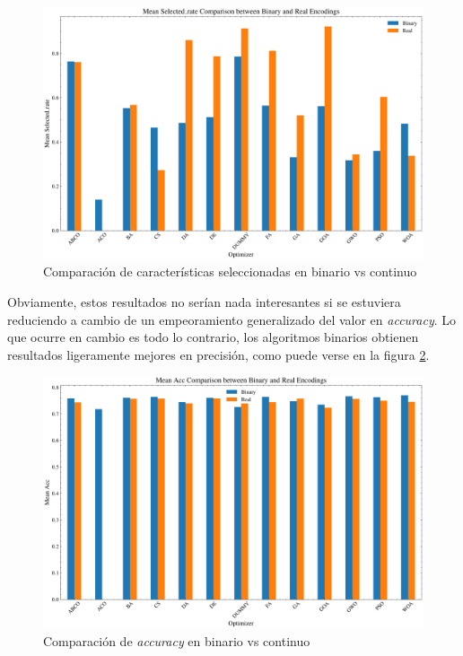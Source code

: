 \begin{figure}[htp]
    \includegraphics[width=1\textwidth]{imagenes/selected_rate_comparison.png}
    \caption{Comparación de características seleccionadas en binario vs continuo}
    \label{fig:bin_vs_real_selected_rate}
\end{figure}

Obviamente, estos resultados no serían nada interesantes si se estuviera reduciendo a cambio de un empeoramiento generalizado del valor en \textit{accuracy}. Lo que ocurre en cambio es todo lo contrario, los algoritmos binarios obtienen resultados ligeramente mejores en precisión, como puede verse en la figura \ref{fig:bin_vs_real_acc}.

\begin{figure}[htp]
    \includegraphics[width=1\textwidth]{imagenes/acc_comparison.png}
    \caption{Comparación de \textit{accuracy} en binario vs continuo}
    \label{fig:bin_vs_real_acc}
\end{figure}


